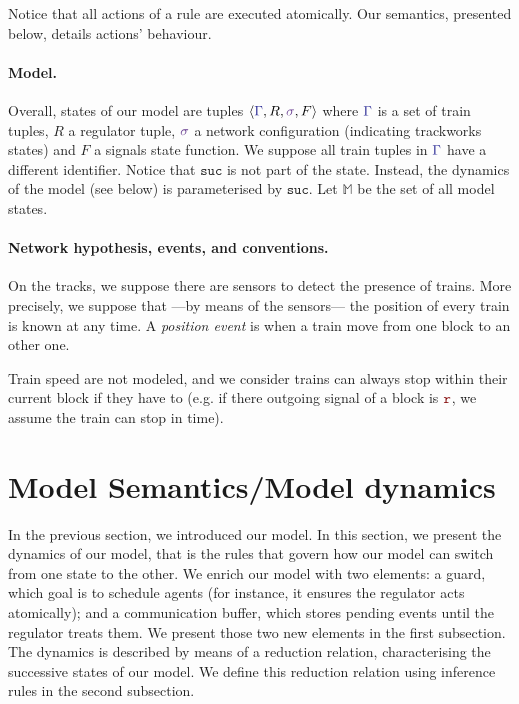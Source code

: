 \documentclass[runningheads]{llncs}
\newcommand{\tuple}[1]{\ensuremath{\langle #1\rangle}}
\newcommand{\sucblock}{{\mathtt{suc}}}
\newcommand{\modelSet}{\ensuremath{\mathbb{M}}}
\newcommand{\swFmt}[1]{{\color{swcolor}{#1}}}
\newcommand{\switches}{\ensuremath{\swFmt{\sigma}}}
\newcommand{\trainFmt}[1]{{\color{traincolor} #1}}
\newcommand{\trainSeq}{\trainFmt{\Gamma\xspace}}
\newcommand{\regulator}{\ensuremath{R}}
\newcommand{\sigred}{{\mbox{${\color{red!50!black}\mathtt{r}}$}}\xspace}
\newcommand{\signals}{\ensuremath{F}}
\begin{document}
Notice that all actions of a rule are executed atomically. Our semantics, presented below, details actions' behaviour.

\paragraph{Model.}
Overall, states of our model are tuples $\tuple{\trainSeq, \regulator, \switches, \signals}$ where $\trainSeq$ is a set of train tuples, $\regulator$ a regulator tuple, $\switches$ a network configuration (indicating trackworks states) and $\signals$ a signals state function. We suppose all train tuples in $\trainSeq$ have a different identifier. Notice that $\sucblock$ is not part of the state. Instead, the dynamics of the model (see below) is parameterised by $\sucblock$. Let $\modelSet$ be the set of all model states.

\paragraph{Network hypothesis, events, and conventions.}
On the tracks, we suppose there are sensors to detect the presence of trains. More precisely, we suppose that ---by means of the sensors--- the position of every train is known at any time. A \emph{position event} is when a train move from one block to an other one. 

Train speed are not modeled, and we consider trains can always stop within their current block if they have to (e.g. if there outgoing signal of a block is \sigred, we assume the train can stop in time).


\section{Model Semantics/Model dynamics}
\label{sec:formal-model}

In the previous section, we introduced our model. In this section, we present the dynamics of our model, that is the rules that govern how our model can switch from one state to the other.
We enrich our model with two elements: a guard, which goal is to schedule agents (for instance, it ensures the regulator acts atomically); and a communication buffer, which stores pending events until the regulator treats them. We present those two new elements in the first subsection.
The dynamics is described by means of a reduction relation, characterising the successive states of our model. We define this reduction relation using inference rules in the second subsection.
\end{document}
